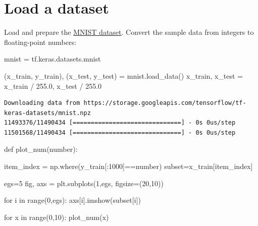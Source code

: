 \documentclass[
  letterpaper,
  DIV=11,
  numbers=noendperiod]{scrreprt}
\newenvironment{Shaded}{\begin{snugshade}}{\end{snugshade}}
\newcommand{\BuiltInTok}[1]{\textcolor[rgb]{0.00,0.23,0.31}{#1}}
\newcommand{\ControlFlowTok}[1]{\textcolor[rgb]{0.00,0.23,0.31}{#1}}
\newcommand{\DecValTok}[1]{\textcolor[rgb]{0.68,0.00,0.00}{#1}}
\newcommand{\FloatTok}[1]{\textcolor[rgb]{0.68,0.00,0.00}{#1}}
\newcommand{\KeywordTok}[1]{\textcolor[rgb]{0.00,0.23,0.31}{#1}}
\newcommand{\NormalTok}[1]{\textcolor[rgb]{0.00,0.23,0.31}{#1}}
\newcommand{\OperatorTok}[1]{\textcolor[rgb]{0.37,0.37,0.37}{#1}}
\begin{document}
\hypertarget{load-a-dataset}{%
\section{Load a dataset}\label{load-a-dataset}}

Load and prepare the \href{http://yann.lecun.com/exdb/mnist/}{MNIST
dataset}. Convert the sample data from integers to floating-point
numbers:

\begin{Shaded}
\begin{Highlighting}[]
\NormalTok{mnist }\OperatorTok{=}\NormalTok{ tf.keras.datasets.mnist}

\NormalTok{(x\_train, y\_train), (x\_test, y\_test) }\OperatorTok{=}\NormalTok{ mnist.load\_data()}
\NormalTok{x\_train, x\_test }\OperatorTok{=}\NormalTok{ x\_train }\OperatorTok{/} \FloatTok{255.0}\NormalTok{, x\_test }\OperatorTok{/} \FloatTok{255.0}
\end{Highlighting}
\end{Shaded}

\begin{verbatim}
Downloading data from https://storage.googleapis.com/tensorflow/tf-keras-datasets/mnist.npz
11493376/11490434 [==============================] - 0s 0us/step
11501568/11490434 [==============================] - 0s 0us/step
\end{verbatim}

\begin{Shaded}
\begin{Highlighting}[]

\KeywordTok{def}\NormalTok{ plot\_num(number):}

\NormalTok{  item\_index }\OperatorTok{=}\NormalTok{ np.where(y\_train[:}\DecValTok{1000}\NormalTok{]}\OperatorTok{==}\NormalTok{number)}
\NormalTok{  subset}\OperatorTok{=}\NormalTok{x\_train[item\_index]}
  
\NormalTok{  egs}\OperatorTok{=}\DecValTok{5}
\NormalTok{  fig, axs }\OperatorTok{=}\NormalTok{ plt.subplots(}\DecValTok{1}\NormalTok{,egs, figsize}\OperatorTok{=}\NormalTok{(}\DecValTok{20}\NormalTok{,}\DecValTok{10}\NormalTok{))}

  \ControlFlowTok{for}\NormalTok{ i }\KeywordTok{in} \BuiltInTok{range}\NormalTok{(}\DecValTok{0}\NormalTok{,egs):}
\NormalTok{    axs[i].imshow(subset[i])}


\ControlFlowTok{for}\NormalTok{ x }\KeywordTok{in} \BuiltInTok{range}\NormalTok{(}\DecValTok{0}\NormalTok{,}\DecValTok{10}\NormalTok{):}
\NormalTok{  plot\_num(x)}
\end{Highlighting}
\end{Shaded}
\end{document}
